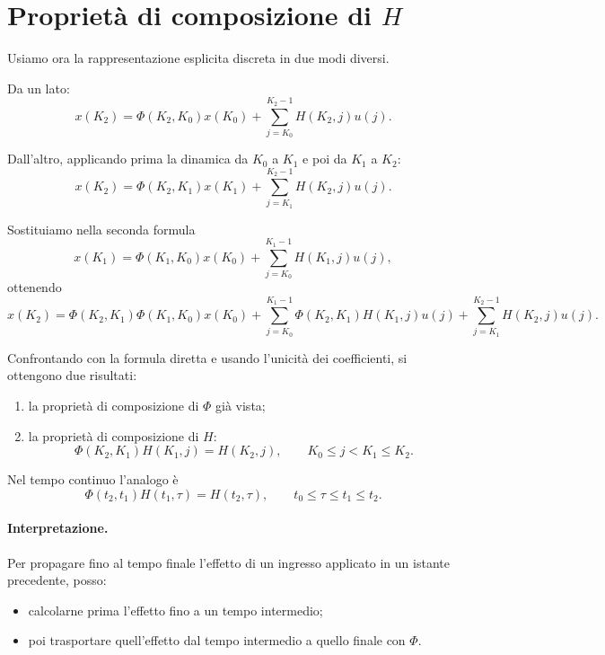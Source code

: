 \section{Proprietà di composizione di \texorpdfstring{$H$}{H}}

Usiamo ora la rappresentazione esplicita discreta in due modi diversi.

Da un lato:
\[
x(K_2)=\Phi(K_2,K_0)x(K_0)+\sum_{j=K_0}^{K_2-1}H(K_2,j)u(j).
\]

Dall'altro, applicando prima la dinamica da $K_0$ a $K_1$ e poi da $K_1$ a $K_2$:
\[
x(K_2)=\Phi(K_2,K_1)x(K_1)+\sum_{j=K_1}^{K_2-1}H(K_2,j)u(j).
\]

Sostituiamo nella seconda formula
\[
x(K_1)=\Phi(K_1,K_0)x(K_0)+\sum_{j=K_0}^{K_1-1}H(K_1,j)u(j),
\]
ottenendo
\[
x(K_2)=
\Phi(K_2,K_1)\Phi(K_1,K_0)x(K_0)
+
\sum_{j=K_0}^{K_1-1}\Phi(K_2,K_1)H(K_1,j)u(j)
+
\sum_{j=K_1}^{K_2-1}H(K_2,j)u(j).
\]

Confrontando con la formula diretta e usando l'unicità dei coefficienti, si ottengono due risultati:

\begin{enumerate}
    \item la proprietà di composizione di $\Phi$ già vista;
    \item la proprietà di composizione di $H$:
    \begin{equation}
    \Phi(K_2,K_1)H(K_1,j)=H(K_2,j),
    \qquad K_0\le j<K_1\le K_2.
    \label{eq:L3_composition_H_TD}
    \end{equation}
\end{enumerate}

Nel tempo continuo l'analogo è
\begin{equation}
\Phi(t_2,t_1)H(t_1,\tau)=H(t_2,\tau),
\qquad t_0\le \tau \le t_1\le t_2.
\label{eq:L3_composition_H_TC}
\end{equation}

\paragraph{Interpretazione.}
Per propagare fino al tempo finale l'effetto di un ingresso applicato in un istante precedente, posso:
\begin{itemize}
    \item calcolarne prima l'effetto fino a un tempo intermedio;
    \item poi trasportare quell'effetto dal tempo intermedio a quello finale con $\Phi$.
\end{itemize}

